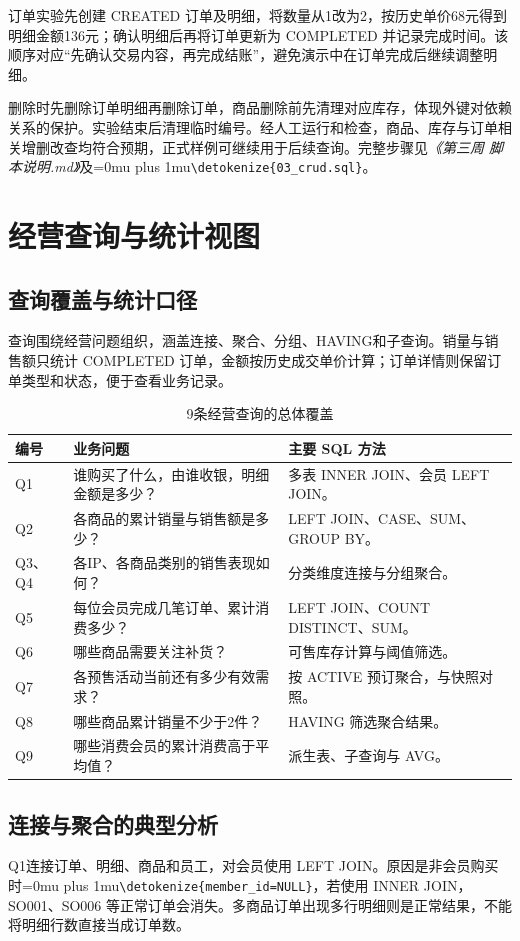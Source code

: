 \documentclass{SYSUReport}
\newcommand{\code}[1]{\begingroup\Urlmuskip=0mu plus 1mu\expandafter\nolinkurl\expandafter{\detokenize{#1}}\endgroup}
\newcommand{\docref}[1]{\textit{《#1》}}
\begin{document}
订单实验先创建 CREATED 订单及明细，将数量从1改为2，按历史单价68元得到明细金额136元；确认明细后再将订单更新为 COMPLETED 并记录完成时间。该顺序对应“先确认交易内容，再完成结账”，避免演示中在订单完成后继续调整明细。

删除时先删除订单明细再删除订单，商品删除前先清理对应库存，体现外键对依赖关系的保护。实验结束后清理临时编号。经人工运行和检查，商品、库存与订单相关增删改查均符合预期，正式样例可继续用于后续查询。完整步骤见\docref{第三周 脚本说明.md}及\code{03_crud.sql}。

\FloatBarrier
\section{经营查询与统计视图}
\subsection{查询覆盖与统计口径}
查询围绕经营问题组织，涵盖连接、聚合、分组、HAVING和子查询。销量与销售额只统计 COMPLETED 订单，金额按历史成交单价计算；订单详情则保留订单类型和状态，便于查看业务记录。

\begin{table}[htbp]
\centering\small
\begin{tabularx}{\textwidth}{P{1.1cm}YP{4.1cm}}
\toprule 编号 & 业务问题 & 主要 SQL 方法 \\
\midrule
Q1 & 谁购买了什么，由谁收银，明细金额是多少？ & 多表 INNER JOIN、会员 LEFT JOIN。\\
Q2 & 各商品的累计销量与销售额是多少？ & LEFT JOIN、CASE、SUM、GROUP BY。\\
Q3、Q4 & 各IP、各商品类别的销售表现如何？ & 分类维度连接与分组聚合。\\
Q5 & 每位会员完成几笔订单、累计消费多少？ & LEFT JOIN、COUNT DISTINCT、SUM。\\
Q6 & 哪些商品需要关注补货？ & 可售库存计算与阈值筛选。\\
Q7 & 各预售活动当前还有多少有效需求？ & 按 ACTIVE 预订聚合，与快照对照。\\
Q8 & 哪些商品累计销量不少于2件？ & HAVING 筛选聚合结果。\\
Q9 & 哪些消费会员的累计消费高于平均值？ & 派生表、子查询与 AVG。\\
\bottomrule
\end{tabularx}
\caption{9条经营查询的总体覆盖}
\end{table}

\subsection{连接与聚合的典型分析}
Q1连接订单、明细、商品和员工，对会员使用 LEFT JOIN。原因是非会员购买时\code{member_id=NULL}，若使用 INNER JOIN，SO001、SO006 等正常订单会消失。多商品订单出现多行明细则是正常结果，不能将明细行数直接当成订单数。
\end{document}
